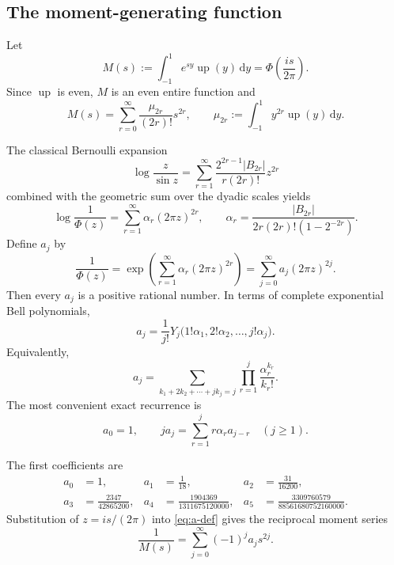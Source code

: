 \documentclass[11pt,oneside]{article}
\theoremstyle{definition}
\theoremstyle{remark}
\newcommand{\up}{\operatorname{up}}
\newcommand{\dd}{\,\mathrm d}
\newcommand{\abs}[1]{\left\lvert#1\right\rvert}
\begin{document}
\subsection{The moment-generating function}

Let
\begin{equation}\label{eq:mgf}
 M(s):=\int_{-1}^{1}e^{sy}\up(y)\dd y
      =\Phi\!\left(\frac{is}{2\pi}\right).
\end{equation}
Since \(\up\) is even, \(M\) is an even entire function and
\begin{equation}\label{eq:mgf-moments}
 M(s)=\sum_{r=0}^{\infty}\frac{\mu_{2r}}{(2r)!}s^{2r},
 \qquad
 \mu_{2r}:=\int_{-1}^{1}y^{2r}\up(y)\dd y.
\end{equation}

The classical Bernoulli expansion
\begin{equation}\label{eq:log-sinc-recip}
 \log\frac{z}{\sin z}
 =\sum_{r=1}^{\infty}
 \frac{2^{2r-1}\abs{B_{2r}}}{r(2r)!}z^{2r}
\end{equation}
combined with the geometric sum over the dyadic scales yields
\begin{equation}\label{eq:alpha-expansion}
 \log\frac1{\Phi(z)}
 =\sum_{r=1}^{\infty}\alpha_r(2\pi z)^{2r},
 \qquad
 \boxed{\displaystyle
 \alpha_r=\frac{\abs{B_{2r}}}
 {2r(2r)!\left(1-2^{-2r}\right)}.}
\end{equation}
Define \(a_j\) by
\begin{equation}\label{eq:a-def}
 \frac1{\Phi(z)}
 =\exp\!\left(\sum_{r=1}^{\infty}\alpha_r(2\pi z)^{2r}\right)
 =\sum_{j=0}^{\infty}a_j(2\pi z)^{2j}.
\end{equation}
Then every \(a_j\) is a positive rational number.  In terms of complete
exponential Bell polynomials,
\begin{equation}\label{eq:a-bell}
 \boxed{\displaystyle
 a_j=\frac1{j!}Y_j\bigl(1!\alpha_1,2!\alpha_2,\ldots,j!\alpha_j\bigr).}
\end{equation}
Equivalently,
\begin{equation}\label{eq:a-partition}
 a_j=\sum_{k_1+2k_2+\cdots+jk_j=j}
 \prod_{r=1}^{j}\frac{\alpha_r^{k_r}}{k_r!}.
\end{equation}
The most convenient exact recurrence is
\begin{equation}\label{eq:a-recurrence}
 \boxed{\displaystyle
 a_0=1,
 \qquad
 ja_j=\sum_{r=1}^{j}r\alpha_r a_{j-r}\quad(j\ge1).}
\end{equation}

The first coefficients are
\begin{equation}\label{eq:first-a}
 \begin{aligned}
 a_0&=1,
 &a_1&=\frac1{18},
 &a_2&=\frac{31}{16200},\\
 a_3&=\frac{2347}{42865200},
 &a_4&=\frac{1904369}{1311675120000},
 &a_5&=\frac{3309760579}{88561680752160000}.
 \end{aligned}
\end{equation}
Substitution of \(z=is/(2\pi)\) into \eqref{eq:a-def} gives the reciprocal
moment series
\begin{equation}\label{eq:reciprocal-M}
 \boxed{\displaystyle
 \frac1{M(s)}=\sum_{j=0}^{\infty}(-1)^ja_js^{2j}.}
\end{equation}
\end{document}
